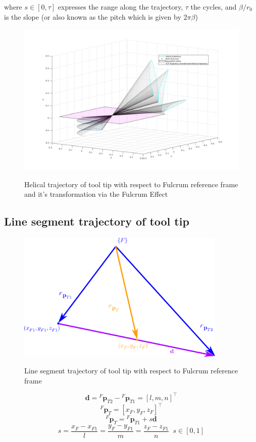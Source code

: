 where $s \in \left[ 0, τ \right]$ expresses the range along the trajectory, $τ$ the cycles, and $β/r_0$ is the slope (or also known as the pitch which is given by $2πβ$)

\begin{center}
\begin{figure}[!htb]
\centering
\includegraphics[width=\textwidth]{images/rcm_trajectories/rcm_helical_traj.png}\\
\caption{Helical trajectory of tool tip with respect to Fulcrum reference frame and it's transformation via the Fulcrum Effect}
\end{figure}
\end{center}

\subsection{Line segment trajectory of tool tip}

\begin{center}
\begin{figure}[!htb]
\centering
\includegraphics[width=10cm]{images/line-segment-trajectory-wrt-fulcrum.png}\\
\caption{Line segment trajectory of tool tip with respect to Fulcrum reference frame}
\end{figure}
\end{center}
\[
\mathbf{d} = {}^{F}\mathbf{p}^{}_{T2} - {}^{F}\mathbf{p}^{}_{T1} = [l, m, n]^\top
\]
\[
{}^{F}\mathbf{p}^{}_{T} = [x^{}_{F}, y^{}_{F}, z^{}_{F}]^\top
\]
\[
{}^{F}\mathbf{p}^{}_{T} = {}^{F}\mathbf{p}^{}_{T1} + s\mathbf{d}
\]
\[
s = \frac{x^{}_{F} - x^{}_{F1}}{l} = \frac{y^{}_{F} - y^{}_{F1}}{m} = \frac{z^{}_{F} - z^{}_{F1}}{n} \;\; s \in [0, 1]
\]

